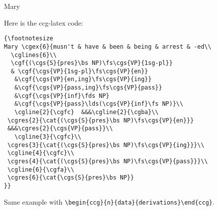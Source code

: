 \documentclass[11pt]{article}
\begin{document}
{\footnotesize
Mary }\bigskip

Here is the ccg-latex code:\bigskip
\begin{verbatim}
{\footnotesize
Mary \cgex{6}{musn't & have & been & being & arrest & -ed\\
  \cglines{6}\\
  \cgf{(\cgs{S}{pres}\bs NP)\fs\cgs{VP}{1sg-pl}}
  & \cgf{\cgs{VP}{1sg-pl}\fs\cgs{VP}{en}}
   &\cgf{\cgs{VP}{en,ing}\fs\cgs{VP}{ing}}
   &\cgf{\cgs{VP}{pass,ing}\fs\cgs{VP}{pass}}
   &\cgf{\cgs{VP}{inf}\fds NP}
   &\cgf{\cgs{VP}{pass}\lds(\cgs{VP}{inf}\fs NP)}\\
   \cgline{2}{\cgfc}  &&&\cgline{2}{\cgba}\\
 \cgres{2}{\cat{(\cgs{S}{pres}\bs NP)\fs\cgs{VP}{en}}} 
 &&&\cgres{2}{\cgs{VP}{pass}}\\
   \cgline{3}{\cgfc}\\
 \cgres{3}{\cat{(\cgs{S}{pres}\bs NP)\fs\cgs{VP}{ing}}}\\
 \cgline{4}{\cgfc}\\
 \cgres{4}{\cat{(\cgs{S}{pres}\bs NP)\fs\cgs{VP}{pass}}}\\
 \cgline{6}{\cgfa}\\
 \cgres{6}{\cat{\cgs{S}{pres}\bs NP}}
}}
\end{verbatim}

\newpage

Same example with \verb|\begin{ccg}{n}{data}{derivations}\end{ccg}|.
\end{document}
